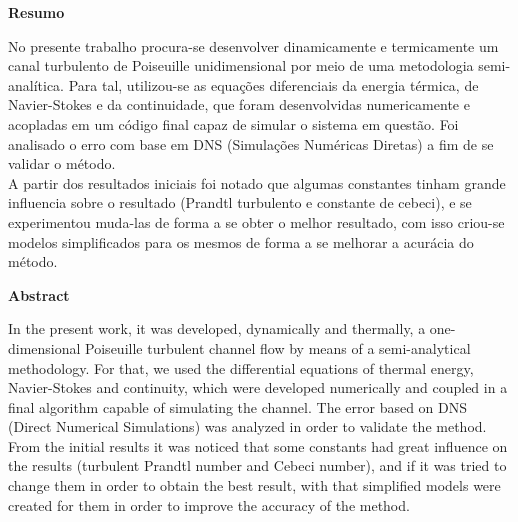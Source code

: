 \begin{huge}
\textbf{Resumo}
\\

\end{huge}

\noindent
	
	No presente trabalho procura-se desenvolver dinamicamente e termicamente um canal turbulento de Poiseuille unidimensional por meio de uma metodologia semi-analítica. Para tal,  utilizou-se as equações diferenciais da energia térmica, de Navier-Stokes e da continuidade, que foram desenvolvidas numericamente e acopladas em um código final capaz de simular o sistema em questão. Foi analisado o erro com base em DNS (Simulações Numéricas Diretas) a fim de se validar o método. \\
	A partir dos resultados iniciais foi notado que algumas constantes tinham grande influencia sobre o resultado (Prandtl turbulento e constante de cebeci), e se experimentou muda-las de forma a se obter o melhor resultado, com isso criou-se modelos simplificados para os mesmos de forma a se melhorar a acurácia do método.

\newpage

\begin{huge}
	\textbf{Abstract}
	\\
	
\end{huge}

\noindent

In the present work, it was developed, dynamically and thermally, a one-dimensional Poiseuille turbulent channel flow by means of a semi-analytical methodology. For that, we used the differential equations of thermal energy, Navier-Stokes and continuity, which were developed numerically and coupled in a final algorithm capable of simulating the channel. The error based on DNS (Direct Numerical Simulations) was analyzed in order to validate the method. \\
From the initial results it was noticed that some constants had great influence on the results (turbulent Prandtl number and Cebeci number), and if it was tried to change them in order to obtain the best result, with that simplified models were created for them in order to improve the accuracy of the method.

\newpage